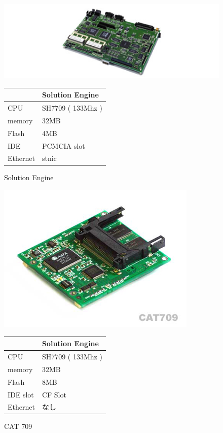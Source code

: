 \documentclass[mingoth,a4paper]{jsarticle}
\begin{document}
\begin{figure}[htbp]
 \begin{minipage}{0.5\hsize}
  \begin{center}
   \includegraphics[width=0.7\hsize]{image200705/solutionengine.jpg}
  \end{center}
  \caption{Solution Engine}
 \end{minipage}
 \begin{minipage}{0.5\hsize}
  \begin{tabular}{|l|l|} \hline
   & Solution Engine \\ \hline
   CPU & SH7709 ( 133Mhz ) \\ \hline
   memory & 32MB\\ \hline
   Flash & 4MB \\ \hline 
   IDE  & PCMCIA slot \\ \hline
   Ethernet & stnic \\ \hline
  \end{tabular}
 \end{minipage}
\end{figure}

\begin{figure}[htbp]
 \begin{minipage}{0.5\hsize}
  \begin{center}
   \includegraphics[width=0.6\hsize]{image200705/cat709.jpg}
  \end{center}
  \caption{CAT 709}
 \end{minipage}
 \begin{minipage}{0.5\hsize}
  \begin{tabular}{|l|l|} \hline
   & Solution Engine \\ \hline
   CPU & SH7709 ( 133Mhz ) \\ \hline
   memory & 32MB\\ \hline
   Flash & 8MB \\ \hline 
   IDE slot & CF Slot \\ \hline
   Ethernet & なし\\ \hline
  \end{tabular}
 \end{minipage}
\end{figure}
\end{document}
